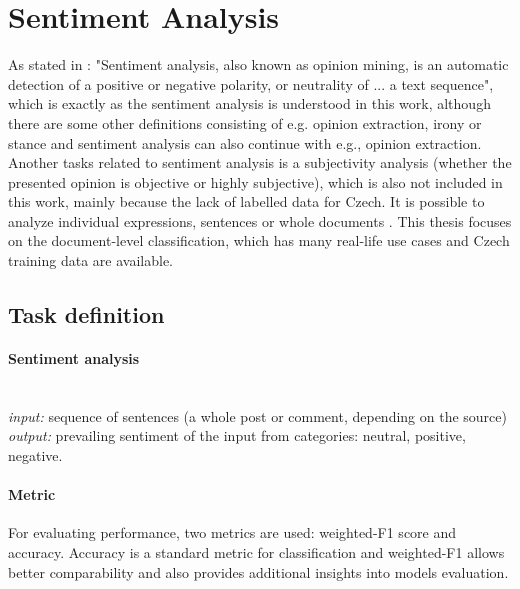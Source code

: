 \section{Sentiment Analysis}
\label{chap:sent}
As stated in \citep{Veselovska}: "Sentiment analysis, also known as opinion mining, is an automatic detection of a positive or negative polarity, or neutrality of ... a text sequence", which is exactly as the sentiment analysis is understood in this work, although there are some other definitions consisting of e.g. opinion extraction, irony or stance \citep{Montoyo2012} and sentiment analysis can also continue with e.g., opinion extraction. Another tasks related to sentiment analysis is a subjectivity analysis (whether the presented opinion is objective or highly subjective), which is also not included in this work, mainly because the lack of labelled data for Czech. It is possible to analyze individual expressions, sentences or whole documents \citep{Veselovska}. This thesis focuses on the document-level classification, which has many real-life use cases and Czech training data are available.
\subsection{Task definition}
\paragraph{Sentiment analysis} \mbox{}\\
\textit{input:} sequence of sentences (a whole post or comment, depending on the source) \\
\textit{output:} prevailing sentiment of the input from categories: neutral, positive, negative.
\par

\paragraph{Metric} For evaluating performance, two metrics are used: weighted-F1 score and accuracy. Accuracy is a standard metric for classification and weighted-F1 allows better comparability and also provides additional insights into models evaluation.

